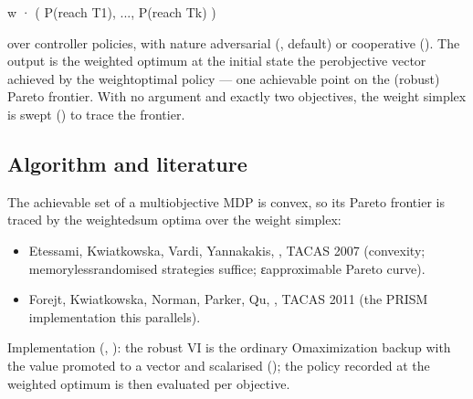 \documentclass[a4paper,10pt,english]{sphinxmanual}
\begin{document}
\begin{sphinxVerbatim}[commandchars=\\\{\}]
w · ( P(reach T\PYGZus{}1), ..., P(reach T\PYGZus{}k) )
\end{sphinxVerbatim}

\sphinxAtStartPar
over controller policies, with nature adversarial (, default) or
cooperative (). The output is the weighted optimum at the initial state
 the per\sphinxhyphen{}objective vector  achieved by the weight\sphinxhyphen{}optimal policy —
one achievable point on the (robust) Pareto frontier. With no  argument and
exactly two objectives, the weight simplex is swept
() to trace the frontier.


\subsection{Algorithm and literature}
\label{\detokenize{manual/multiobjective:algorithm-and-literature}}
\sphinxAtStartPar
The achievable set of a multi\sphinxhyphen{}objective MDP is convex, so its Pareto frontier is traced
by the weighted\sphinxhyphen{}sum optima over the weight simplex:
\begin{itemize}
\item {} 
\sphinxAtStartPar
Etessami, Kwiatkowska, Vardi, Yannakakis, , TACAS 2007 (convexity; memoryless\sphinxhyphen{}randomised strategies
suffice; ε\sphinxhyphen{}approximable Pareto curve).

\item {} 
\sphinxAtStartPar
Forejt, Kwiatkowska, Norman, Parker, Qu, , TACAS 2011 (the PRISM implementation this parallels).

\end{itemize}

\sphinxAtStartPar
Implementation (, ): the robust VI is the
ordinary O\sphinxhyphen{}maximization backup with the value promoted to a vector and scalarised
(); the policy recorded at the weighted optimum is then
evaluated per objective.
\end{document}
